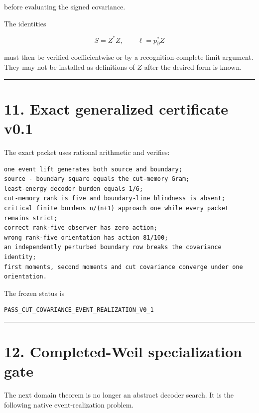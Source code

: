 before evaluating the signed covariance.

The identities

\[
S=Z^*Z,
\qquad
\ell=p_\partial^*Z
\]

must then be verified coefficientwise or by a recognition-complete limit
argument. They may not be installed as definitions of \(Z\) after the desired
form is known.

\begin{center}\rule{0.5\linewidth}{0.5pt}\end{center}

\hypertarget{exact-generalized-certificate-v0.1}{%
\section{11. Exact generalized certificate v0.1}\label{exact-generalized-certificate-v0.1}}

The exact packet uses rational arithmetic and verifies:

\begin{verbatim}
one event lift generates both source and boundary;
source - boundary square equals the cut-memory Gram;
least-energy decoder burden equals 1/6;
cut-memory rank is five and boundary-line blindness is absent;
critical finite burdens n/(n+1) approach one while every packet remains strict;
correct rank-five observer has zero action;
wrong rank-five orientation has action 81/100;
an independently perturbed boundary row breaks the covariance identity;
first moments, second moments and cut covariance converge under one orientation.
\end{verbatim}

The frozen status is

\begin{verbatim}
PASS_CUT_COVARIANCE_EVENT_REALIZATION_V0_1
\end{verbatim}

\begin{center}\rule{0.5\linewidth}{0.5pt}\end{center}

\hypertarget{completed-weil-specialization-gate}{%
\section{12. Completed-Weil specialization gate}\label{completed-weil-specialization-gate}}

The next domain theorem is no longer an abstract decoder search. It is the
following native event-realization problem.

